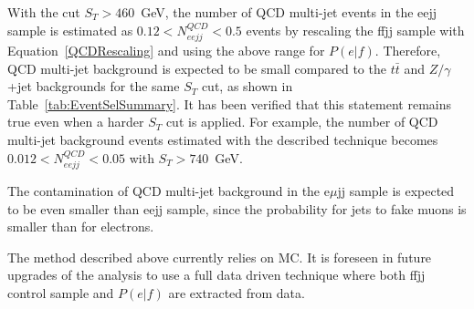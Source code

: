 
With the cut $S_T>460$~GeV, the number of QCD multi-jet events in the eejj sample is estimated as 
$0.12<N_{eejj}^{QCD}<0.5$ events by rescaling the ffjj sample 
with Equation~\ref{QCDRescaling} and using the above range for $P(e|f)$. 
Therefore, QCD multi-jet background is expected to be small compared to 
the $t\bar{t}$ and $Z/\gamma$+jet backgrounds for the same $S_T$ cut, 
as shown in Table~\ref{tab:EventSelSummary}. 
It has been verified that this statement remains true even when a harder $S_T$ cut is applied.
For example, the number of QCD multi-jet background events estimated with the described technique
becomes $0.012<N_{eejj}^{QCD}<0.05$ with $S_T>740$~GeV.

The contamination of QCD multi-jet background in the e$\mu$jj sample 
is expected to be even smaller than eejj sample, since the probability for jets to fake muons 
is smaller than for electrons. %

The method described above currently relies on MC. 
It is foreseen in future upgrades of the analysis to use a full data driven technique where 
both ffjj control sample and $P(e|f)$ are extracted from data. 

%
